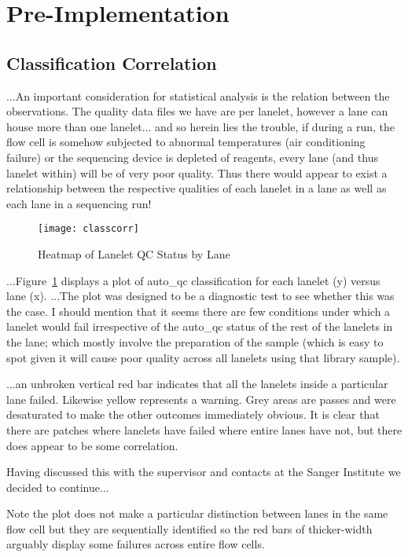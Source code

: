 \section{Pre-Implementation}
\subsection{Classification Correlation}
...An important consideration for statistical analysis is the relation between the
observations. The quality data files we have are per lanelet, however a lane can
house more than one lanelet...  and so herein lies the trouble, if during a run,
the flow cell is somehow subjected to abnormal temperatures (air conditioning
failure) or the sequencing device is depleted of reagents, every lane (and thus
lanelet within) will be of very poor quality. Thus there would appear to exist a
relationship between the respective qualities of each lanelet in a lane as well
as each lane in a sequencing run!

\begin{figure}[htbp!]
    \centering
    \texttt{[image: classcorr]}
    \caption[ClassCorr]{Heatmap of Lanelet QC Status by Lane}
    \label{fig:classcorr}
\end{figure}

...Figure~\ref{fig:classcorr} displays a plot of auto\_qc classification for
each lanelet (y) versus lane (x). ...The plot was designed to be a diagnostic
test to see whether this was the case. I should mention that it seems there are
few conditions under which a lanelet would fail irrespective of the auto\_qc
status of the rest of the lanelets in the lane; which mostly involve the
preparation of the sample (which is easy to spot given it will cause poor
quality across all lanelets using that library sample).

...an unbroken vertical red bar indicates that all the lanelets inside a
particular lane failed. Likewise yellow represents a warning. Grey areas are
passes and were desaturated to make the other outcomes immediately obvious. It
is clear that there are patches where lanelets have failed where entire lanes
have not, but there does appear to be some correlation.

Having discussed this with the supervisor and contacts at the Sanger Institute
we decided to continue...

Note the plot does not make a particular distinction between lanes in the same
flow cell but they are sequentially identified so the red bars of thicker-width
arguably display some failures across entire flow cells.

